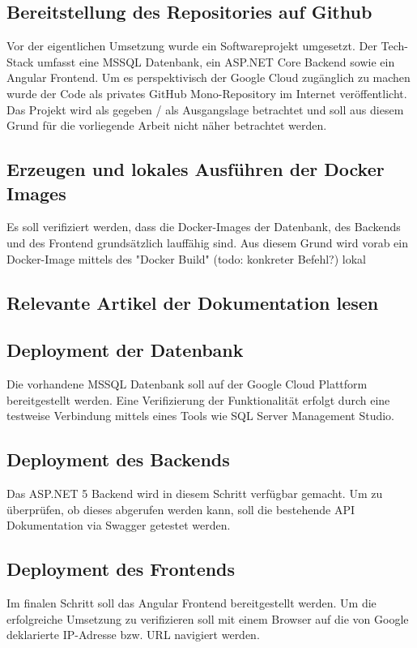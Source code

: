 \documentclass[pdftex,a4paper,abstracton,11pt,parskip=half,bibtotocnumbered]{scrartcl}
\begin{document}
	\subsection{Bereitstellung des Repositories auf Github}
	Vor der eigentlichen Umsetzung wurde ein Softwareprojekt umgesetzt. Der Tech-Stack umfasst eine MSSQL Datenbank, ein ASP.NET Core Backend sowie	ein
	Angular Frontend. Um es perspektivisch der Google Cloud zugänglich zu machen wurde der Code als privates GitHub Mono-Repository im Internet veröffentlicht.
	Das Projekt wird als gegeben / als Ausgangslage betrachtet und soll aus diesem Grund für die vorliegende Arbeit nicht näher betrachtet werden.  

	\subsection{Erzeugen und lokales Ausführen der Docker Images}
	Es soll verifiziert werden, dass die Docker-Images der Datenbank, des Backends und des Frontend grundsätzlich lauffähig sind. Aus diesem Grund wird 
	vorab ein Docker-Image mittels des "Docker Build" (todo: konkreter Befehl?) lokal 
	
	\subsection{Relevante Artikel der Dokumentation lesen}

	\subsection{Deployment der Datenbank}
		Die vorhandene MSSQL Datenbank soll auf der Google Cloud Plattform bereitgestellt werden. Eine Verifizierung der Funktionalität erfolgt durch 
		eine testweise Verbindung mittels eines Tools wie SQL Server Management Studio. 
	
	\subsection{Deployment des Backends}
		Das ASP.NET 5 Backend wird in diesem Schritt verfügbar gemacht. Um zu überprüfen, ob dieses abgerufen werden kann, soll die bestehende API 
		Dokumentation via Swagger getestet werden. 
	
	\subsection{Deployment des Frontends}
		Im finalen Schritt soll das Angular Frontend bereitgestellt werden. Um die erfolgreiche Umsetzung zu verifizieren soll mit einem Browser auf
		die von Google deklarierte IP-Adresse bzw. URL navigiert werden.
\end{document}
